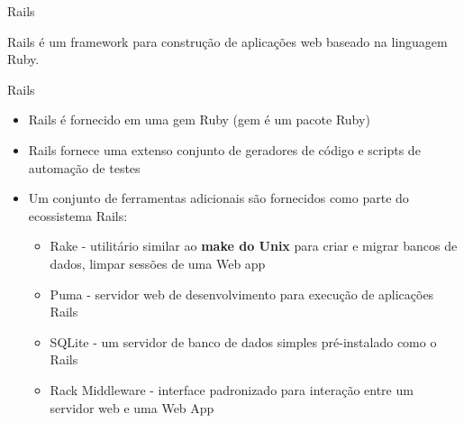 \begin{frame}{Rails}
	\begin{center}
		\large Rails é um \alert{framework} para construção de \alert{aplicações web} baseado na \alert{linguagem Ruby}.
	\end{center}
\end{frame}
\begin{frame}{Rails}
	\begin{itemize}
		\item Rails é fornecido em uma \alert{gem} Ruby (gem é um pacote Ruby)
		\item Rails fornece uma extenso conjunto de geradores de código e scripts de automação de testes
		\item Um conjunto de ferramentas adicionais são fornecidos como parte do ecossistema Rails:
		\begin{itemize}
			\item \alert{Rake} - utilitário similar ao \textbf{make do Unix} para criar e migrar bancos de dados, limpar sessões de uma Web app
			\item \alert{Puma} - servidor web de desenvolvimento para execução de aplicações Rails
			\item \alert{SQLite} - um servidor de banco de dados simples pré-instalado como o Rails
			\item \alert{Rack Middleware} - interface padronizado para interação entre um servidor web e uma Web App
		\end{itemize}
	\end{itemize}
\end{frame}
